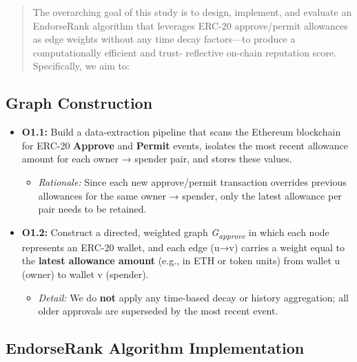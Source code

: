 \documentclass[
]{article}
\begin{document}
\begin{quote}
The overarching goal of this study is to design, implement, and evaluate an EndorseRank algorithm that leverages ERC-20 approve/permit allowances as edge weights without any time decay factors---to produce a computationally efficient and trust- reflective on-chain reputation score. Specifically, we aim to:
\end{quote}

\subsection{Graph Construction}\label{graph-construction}

\begin{itemize}
\item
  \textbf{O1.1:} Build a data-extraction pipeline that scans the Ethereum blockchain for ERC-20 \textbf{Approve} and \textbf{Permit} events, isolates the most recent allowance amount for each owner → spender pair, and stores these values.

  \begin{itemize}
  \item
    \emph{Rationale:} Since each new approve/permit transaction overrides previous allowances for the same owner → spender, only the latest allowance per pair needs to be retained.
  \end{itemize}
\item
  \textbf{O1.2:} Construct a directed, weighted graph \emph{G\textsubscript{approve}} in which each node represents an ERC-20 wallet, and each edge (u→v) carries a weight equal to the \textbf{latest allowance amount} (e.g., in ETH or token units) from wallet u (owner) to wallet v (spender).

  \begin{itemize}
  \item
    \emph{Detail:} We do \textbf{not} apply any time-based decay or history aggregation; all older approvals are superseded by the most recent event.
  \end{itemize}
\end{itemize}

\subsection{EndorseRank Algorithm Implementation}\label{endorserank-algorithm-implementation}
\end{document}
